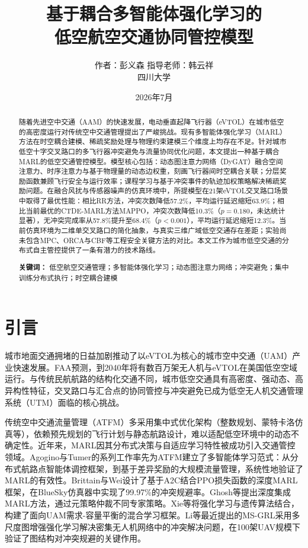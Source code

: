 \documentclass[12pt,a4paper,UTF8]{ctexart}
\title{\textbf{基于耦合多智能体强化学习的\\低空航空交通协同管控模型}}
\author{作者：彭义森 \quad 指导老师：韩云祥 \\ 四川大学}
\date{2026年7月}
\begin{document}
\maketitle

\begin{abstract}
随着先进空中交通（AAM）的快速发展，电动垂直起降飞行器（eVTOL）在城市低空的高密度运行对传统空中交通管理提出了严峻挑战。现有多智能体强化学习（MARL）方法在时空耦合建模、稀疏奖励处理与物理约束建模三个维度上均存在不足。针对城市低空十字交叉路口的多飞行器冲突避免与流量协同优化问题，本文提出一种基于耦合MARL的低空交通管控模型。模型核心包括：动态图注意力网络（DyGAT）融合空间注意力、时序注意力与基于物理量的动态边权重，刻画飞行器间时空耦合关联；分层奖励函数兼顾飞行安全与运行效率；课程学习与基于冲突事件的轨迹加权策略解决稀疏奖励问题。在融合风扰与传感器噪声的仿真环境中，所提模型在21架eVTOL交叉路口场景中取得了最优性能：相比RR方法，冲突次数降低57.2\%，平均运行延迟缩短63.9\%；相比当前最优的CTDE-MARL方法MAPPO，冲突次数降低10.3\%（$p=0.180$，未达统计显著），无冲突完成率从57.8\%提升至68.4\%（$p<0.001$），平均运行延迟缩短12.3\%。当前仿真环境为二维单交叉路口的简化抽象，与真实三维广域低空交通存在差距；实验尚未包含MPC、ORCA与CBF等工程安全关键方法的对比。本文工作为城市低空交通的分布式自主管控提供了一条有潜力的技术路线。

\noindent \textbf{关键词：} 低空航空交通管理；多智能体强化学习；动态图注意力网络；冲突避免；集中训练分布式执行；时空耦合建模
\end{abstract}

\section{引言}

城市地面交通拥堵的日益加剧推动了以eVTOL为核心的城市空中交通（UAM）产业快速发展。FAA预测，到2040年将有数百万架无人机与eVTOL在美国低空空域运行。与传统民航航路的结构化交通不同，城市低空交通具有高密度、强动态、高异构性特征，交叉路口与汇合点的协同管控与冲突避免已成为低空无人机交通管理系统（UTM）面临的核心挑战。

传统空中交通流量管理（ATFM）多采用集中式优化架构（整数规划、蒙特卡洛仿真等），依赖预先规划的飞行计划与静态航路设计，难以适配低空环境中的动态不确定性。近年来，MARL因其分布式决策与自适应学习特性被成功引入交通管控领域。Agogino与Tumer的系列工作率先为ATFM建立了多智能体学习范式：从分布式航路点智能体调控框架\cite{ref1}，到基于差异奖励的大规模流量管理\cite{ref2}，系统性地验证了MARL的有效性。Brittain与Wei设计了基于A2C结合PPO损失函数的深度MARL框架，在BlueSky仿真器中实现了99.97\%的冲突规避率\cite{ref3}。Ghosh等提出深度集成MARL方法，通过元策略仲裁不同专家策略\cite{ref9}。Xie等将强化学习与遗传算法结合，构建了面向UAM需求-容量平衡的混合学习框架\cite{ref6}。Li等最近提出的MS-GRL采用多尺度图增强强化学习解决密集无人机网络中的冲突解决问题，在100架UAV规模下验证了图结构对冲突规避的关键作用\cite{ref24}。
\end{document}
